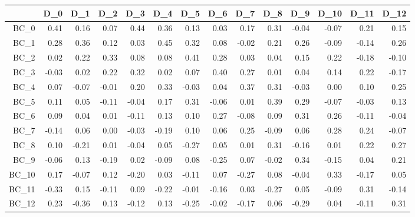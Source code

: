 \documentclass[10pt,a4paper]{article}\usepackage[]{graphicx}\usepackage[]{color}
\begin{document}
\begin{table}[ht]
\centering
\begin{tabular}{rrrrrrrrrrrrrr}
  \hline
 & D\_0 & D\_1 & D\_2 & D\_3 & D\_4 & D\_5 & D\_6 & D\_7 & D\_8 & D\_9 & D\_10 & D\_11 & D\_12 \\ 
  \hline
BC\_0 & 0.41 & 0.16 & 0.07 & 0.44 & 0.36 & 0.13 & 0.03 & 0.17 & 0.31 & -0.04 & -0.07 & 0.21 & 0.15 \\ 
  BC\_1 & 0.28 & 0.36 & 0.12 & 0.03 & 0.45 & 0.32 & 0.08 & -0.02 & 0.21 & 0.26 & -0.09 & -0.14 & 0.26 \\ 
  BC\_2 & 0.02 & 0.22 & 0.33 & 0.08 & 0.08 & 0.41 & 0.28 & 0.03 & 0.04 & 0.15 & 0.22 & -0.18 & -0.10 \\ 
  BC\_3 & -0.03 & 0.02 & 0.22 & 0.32 & 0.02 & 0.07 & 0.40 & 0.27 & 0.01 & 0.04 & 0.14 & 0.22 & -0.17 \\ 
  BC\_4 & 0.07 & -0.07 & -0.01 & 0.20 & 0.33 & -0.03 & 0.04 & 0.37 & 0.31 & -0.03 & 0.00 & 0.10 & 0.25 \\ 
  BC\_5 & 0.11 & 0.05 & -0.11 & -0.04 & 0.17 & 0.31 & -0.06 & 0.01 & 0.39 & 0.29 & -0.07 & -0.03 & 0.13 \\ 
  BC\_6 & 0.09 & 0.04 & 0.01 & -0.11 & 0.13 & 0.10 & 0.27 & -0.08 & 0.09 & 0.31 & 0.26 & -0.11 & -0.04 \\ 
  BC\_7 & -0.14 & 0.06 & 0.00 & -0.03 & -0.19 & 0.10 & 0.06 & 0.25 & -0.09 & 0.06 & 0.28 & 0.24 & -0.07 \\ 
  BC\_8 & 0.10 & -0.21 & 0.01 & -0.04 & 0.05 & -0.27 & 0.05 & 0.01 & 0.31 & -0.16 & 0.01 & 0.22 & 0.27 \\ 
  BC\_9 & -0.06 & 0.13 & -0.19 & 0.02 & -0.09 & 0.08 & -0.25 & 0.07 & -0.02 & 0.34 & -0.15 & 0.04 & 0.21 \\ 
  BC\_10 & 0.17 & -0.07 & 0.12 & -0.20 & 0.03 & -0.11 & 0.07 & -0.27 & 0.08 & -0.04 & 0.33 & -0.17 & 0.05 \\ 
  BC\_11 & -0.33 & 0.15 & -0.11 & 0.09 & -0.22 & -0.01 & -0.16 & 0.03 & -0.27 & 0.05 & -0.09 & 0.31 & -0.14 \\ 
  BC\_12 & 0.23 & -0.36 & 0.13 & -0.12 & 0.13 & -0.25 & -0.02 & -0.17 & 0.06 & -0.29 & 0.04 & -0.11 & 0.31 \\ 
   \hline
\end{tabular}
\end{table}
\end{document}
